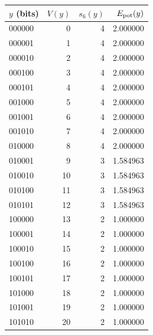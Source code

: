 \begin{tabular}{l r r r}%
\hline%
\textbf{$y$ (bits)}&$V(y)$&$s_6(y)$&$E_{\mathrm{pot}}(y)$\\%
\hline%
000000&0&4&2.000000\\%
000001&1&4&2.000000\\%
000010&2&4&2.000000\\%
000100&3&4&2.000000\\%
000101&4&4&2.000000\\%
001000&5&4&2.000000\\%
001001&6&4&2.000000\\%
001010&7&4&2.000000\\%
010000&8&4&2.000000\\%
010001&9&3&1.584963\\%
010010&10&3&1.584963\\%
010100&11&3&1.584963\\%
010101&12&3&1.584963\\%
100000&13&2&1.000000\\%
100001&14&2&1.000000\\%
100010&15&2&1.000000\\%
100100&16&2&1.000000\\%
100101&17&2&1.000000\\%
101000&18&2&1.000000\\%
101001&19&2&1.000000\\%
101010&20&2&1.000000\\%
\hline%
\end{tabular}
